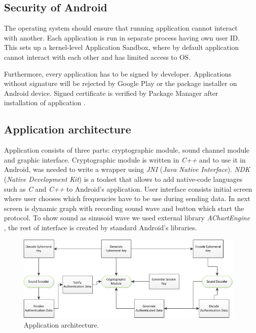 \documentclass[11pt,titlepage]{article}
\theoremstyle{plain}
\begin{document}
\subsection{Security of Android}

The operating system should ensure that running application cannot interact with another. Each application is run in separate process having own user ID. This sets up a kernel-level Application Sandbox, where by default application cannot interact with each other and has limited access to OS.

\vspace{5mm}

Furthermore, every application has to be signed by developer. Applications without signature will be rejected by Google Play or the package installer on Android device. Signed certificate is verified by Package Manager after installation of application \cite{android_sec}.

\subsection{Application architecture}

Application consists of three parts: cryptographic module, sound channel module and graphic interface. Cryptographic module is written in \textit{C++} and to use it in Android, was needed to write a wrapper using \textit{JNI} (\textit{Java Native Interface}). \textit{NDK} (\textit{Native Development Kit}) is a toolset that allows to add native-code languages such as \textit{C} and \textit{C++} to Android's application. User interface consists initial screen where user chooses which frequencies have to be use during sending data. In next screen is dynamic graph with recording sound wave and button which start the protocol. To show sound as sinusoid wave we used external library \textit{AChartEngine} \cite{chart_eng}, the rest of interface is created by standard Android's libraries.

\vspace{5mm}

\begin{figure}[H]
	\centering
	\includegraphics[width=1\textwidth]{img/architecture}
	\caption{Application architecture.}
\end{figure}
\end{document}
